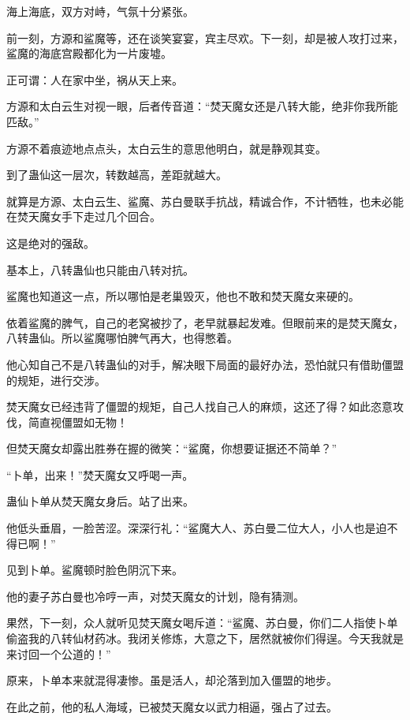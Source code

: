 
\begin{this_body}



海上海底，双方对峙，气氛十分紧张。

前一刻，方源和鲨魔等，还在谈笑宴宴，宾主尽欢。下一刻，却是被人攻打过来，鲨魔的海底宫殿都化为一片废墟。

正可谓：人在家中坐，祸从天上来。

方源和太白云生对视一眼，后者传音道：“焚天魔女还是八转大能，绝非你我所能匹敌。”

方源不着痕迹地点点头，太白云生的意思他明白，就是静观其变。

到了蛊仙这一层次，转数越高，差距就越大。

就算是方源、太白云生、鲨魔、苏白曼联手抗战，精诚合作，不计牺牲，也未必能在焚天魔女手下走过几个回合。

这是绝对的强敌。

基本上，八转蛊仙也只能由八转对抗。

鲨魔也知道这一点，所以哪怕是老巢毁灭，他也不敢和焚天魔女来硬的。

依着鲨魔的脾气，自己的老窝被抄了，老早就暴起发难。但眼前来的是焚天魔女，八转蛊仙。所以鲨魔哪怕脾气再大，也得憋着。

他心知自己不是八转蛊仙的对手，解决眼下局面的最好办法，恐怕就只有借助僵盟的规矩，进行交涉。

焚天魔女已经违背了僵盟的规矩，自己人找自己人的麻烦，这还了得？如此恣意攻伐，简直视僵盟如无物！

但焚天魔女却露出胜券在握的微笑：“鲨魔，你想要证据还不简单？”

“卜单，出来！”焚天魔女又呼喝一声。

蛊仙卜单从焚天魔女身后。站了出来。

他低头垂眉，一脸苦涩。深深行礼：“鲨魔大人、苏白曼二位大人，小人也是迫不得已啊！”

见到卜单。鲨魔顿时脸色阴沉下来。

他的妻子苏白曼也冷哼一声，对焚天魔女的计划，隐有猜测。

果然，下一刻，众人就听见焚天魔女喝斥道：“鲨魔、苏白曼，你们二人指使卜单偷盗我的八转仙材药冰。我闭关修炼，大意之下，居然就被你们得逞。今天我就是来讨回一个公道的！”

原来，卜单本来就混得凄惨。虽是活人，却沦落到加入僵盟的地步。

在此之前，他的私人海域，已被焚天魔女以武力相逼，强占了过去。


\end{this_body}
